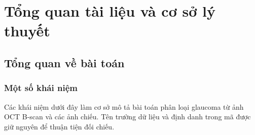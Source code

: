 \documentclass[14pt,a4paper,oneside]{extreport}
\begin{document}
\chapter{Tổng quan tài liệu và cơ sở lý thuyết}
\label{chap:background}

\section{Tổng quan về bài toán}

\subsection{Một số khái niệm}
Các khái niệm dưới đây làm cơ sở mô tả bài toán phân loại glaucoma
từ ảnh OCT B-scan và các ảnh chiếu. Tên trường dữ liệu và định danh
trong mã được giữ nguyên để thuận tiện đối chiếu.
\end{document}

